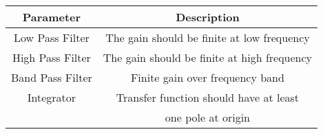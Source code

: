 \begin{tabular}{|c|c|}
\hline
\textbf{Parameter} & \textbf{Description}\\
\hline 
Low Pass Filter & The gain should be finite at low frequency  \\
\hline
High Pass Filter &The gain should be finite at high frequency \\
\hline
Band Pass Filter& Finite gain over frequency band \\
\hline
Integrator & Transfer function should have at least\\& one pole at origin \\
\hline
\end{tabular}
